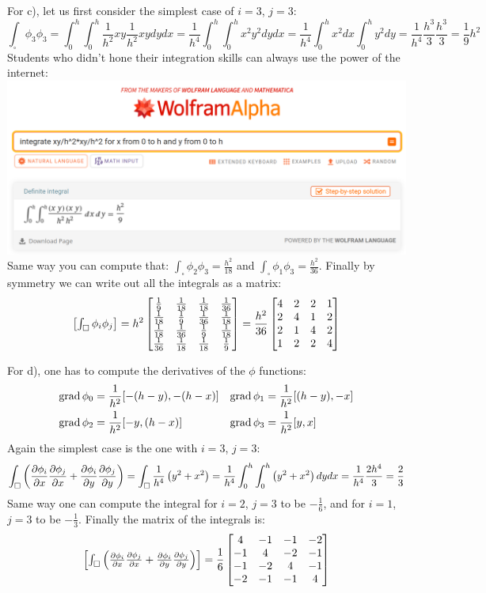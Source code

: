 \documentclass[12pt,class=article,crop=false,preview=false]{standalone}
\begin{document}
\begin{solution}
For c), let us first consider the simplest case of $i=3$, $j=3$:
\[\int_\square\phi_3\phi_3 = \int_0^h\int_0^h\frac{1}{h^2}xy\frac{1}{h^2}xydydx = \frac{1}{h^4}\int_0^h\int_0^h x^2y^2dydx = \frac{1}{h^4}\int_0^h x^2dx\int_0^hy^2dy = \frac{1}{h^4}\frac{h^3}{3}\frac{h^3}{3} = \frac{1}{9}h^2\]
Students who didn't hone their integration skills can always use the power of the internet:
\includegraphics[width=\textwidth]{img/integral1.png}
Same way you can compute that: $\int_\square\phi_2\phi_3 = \frac{h^2}{18}$ and $\int_\square\phi_1\phi_3 = \frac{h^2}{36}$. Finally by symmetry we can write out all the integrals as a matrix:
\[\left[\begin{matrix}\int_\square\phi_i\phi_j\end{matrix}\right] = h^2\left[\begin{matrix}
\frac{1}{9} & \frac{1}{18} & \frac{1}{18} & \frac{1}{36}\\
\frac{1}{18} & \frac{1}{9} & \frac{1}{36} & \frac{1}{18}\\
\frac{1}{18} & \frac{1}{36} & \frac{1}{9} & \frac{1}{18}\\
\frac{1}{36} & \frac{1}{18} & \frac{1}{18} & \frac{1}{9}\end{matrix}\right] = \frac{h^2}{36}\left[\begin{matrix}
4 & 2 & 2 & 1\\
2 & 4 & 1 & 2\\
2 & 1 & 4 & 2\\
1 & 2 & 2 & 4\end{matrix}\right]\]

For d), one has to compute the derivatives of the $\phi$ functions:
\begin{align*}
    \operatorname{grad}\phi_0 &= \frac{1}{h^2}[-(h-y),-(h-x)] & \operatorname{grad}\phi_1 &= \frac{1}{h^2}[(h-y),-x]\\
    \operatorname{grad}\phi_2 &= \frac{1}{h^2}[-y,(h-x)] & \operatorname{grad}\phi_3 &= \frac{1}{h^2}[y,x]
\end{align*}
Again the simplest case is the one with $i=3$, $j=3$:
\[\int_\square \left(\frac{\partial \phi_i}{\partial x}\frac{\partial \phi_j}{\partial x} + \frac{\partial \phi_i}{\partial y}\frac{\partial \phi_j}{\partial y}\right) = \int_\square \frac{1}{h^4}\left(y^2+x^2\right)= \frac{1}{h^4}\int_0^h\int_0^h \left(y^2+x^2\right)dydx=\frac{1}{h^4}\frac{2h^4}{3} = \frac{2}{3}\]
Same way one can compute the integral for $i=2$, $j=3$ to be $-\frac{1}{6}$, and for $i=1$, $j=3$ to be $-\frac{1}{3}$. Finally the matrix of the integrals is:
\[\left[\begin{matrix}\int_\square \left(\frac{\partial \phi_i}{\partial x}\frac{\partial \phi_j}{\partial x} + \frac{\partial \phi_i}{\partial y}\frac{\partial \phi_j}{\partial y}\right)\end{matrix}\right] = \frac{1}{6}\left[\begin{matrix}
4 & -1 & -1 & -2\\
-1 & 4 & -2 & -1\\
-1 & -2 & 4 & -1\\
-2 & -1 & -1 & 4\end{matrix}\right]\]
\end{solution}
\end{document}
